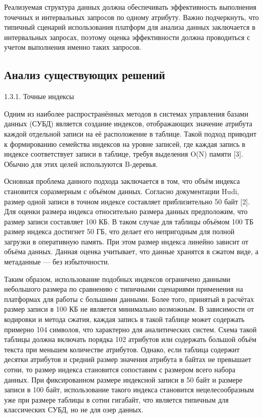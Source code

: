 Реализуемая структура данных должна обеспечивать эффективность выполнения точечных и интервальных запросов по одному атрибуту. Важно подчеркнуть, что типичный сценарий использования платформ для анализа данных заключается в интервальных запросах, поэтому оценка эффективности должна проводиться с учетом выполнения именно таких запросов.


\subsection{Анализ существующих решений} \label{indexes}

1.3.1. Точные индексы

Одним из наиболее распространённых методов в системах управления базами данных (СУБД) является создание индексов, отображающих значение атрибута каждой отдельной записи на её расположение в таблице. Такой подход приводит к формированию семейства индексов на уровне записей, где каждая запись в индексе соответствует записи в таблице, требуя выделения O(N) памяти [3]. Обычно для этих целей используются B-деревья.

Основная проблема данного подхода заключается в том, что объём индекса становится соразмерным с объёмом данных. Согласно документации Hudi, размер одной записи в точном индексе составляет приблизительно 50 байт [2]. Для оценки размера индекса относительно размера данных предположим, что размер записи составляет 100 КБ. В таком случае для таблицы объёмом 100 ТБ размер индекса достигнет 50 ГБ, что делает его непригодным для полной загрузки в оперативную память. При этом размер индекса линейно зависит от объёма данных. Данная оценка учитывает, что данные хранятся в сжатом виде, а метаданные — без избыточности.

Таким образом, использование подобных индексов ограничено данными небольшого размера по сравнению с типичными сценариями применения на платформах для работы с большими данными. Более того, принятый в расчётах размер записи в 100 КБ не является минимально возможным. В зависимости от кодировки и метода сжатия, каждая запись в такой таблице может содержать примерно 104 символов, что характерно для аналитических систем. Схема такой таблицы должна включать порядка 102 атрибутов или содержать большой объём текста при меньшем количестве атрибутов. Однако, если таблица содержит десятки атрибутов и средний размер значения атрибута в байтах не превышает сотни, то размер индекса становится сопоставим с размером всего набора данных. При фиксированном размере индексной записи в 50 байт и размере записи в 100 байт, использование такого индекса становится нецелесообразным уже при размере таблицы в сотни гигабайт, что является типичным для классических СУБД, но не для озер данных.

